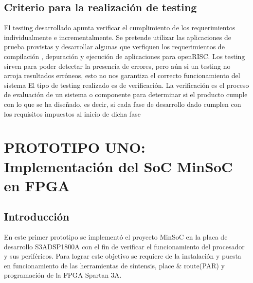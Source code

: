 		\subsection{Criterio para la realización de testing}%
		El testing desarrollado apunta verificar el cumplimiento de los requerimientos individualmente e incrementalmente. Se pretende utilizar las
		aplicaciones de prueba provistas y desarrollar algunas que verfiquen los requerimientos de compilación , depuración y ejecución de aplicaciones para
		openRISC. 
Los testing sirven para poder detectar la presencia de errores, pero aún si un testing no arroja resultados erróneos, esto no nos garantiza el correcto funcionamiento del sistema 
El tipo de testing realizado es de verificación. La verificación es el proceso de evaluación de un sistema o componente para determinar si el producto cumple con lo que se ha diseñado, es decir, si cada fase de desarrollo dado cumplen con los requisitos impuestos al inicio de dicha fase

\newpage
	\section{PROTOTIPO UNO: Implementación del SoC MinSoC en FPGA}
		\subsection{Introducción}
		
	En este primer prototipo se implementó el proyecto MinSoC en la placa de desarrollo S3ADSP1800A con el fin de verificar el funcionamiento del procesador y sus periféricos. Para lograr este objetivo se requiere de la instalación y puesta en funcionamiento de las herramientas de síntensis, place \& route(PAR) y programación de la FPGA Spartan 3A. 

